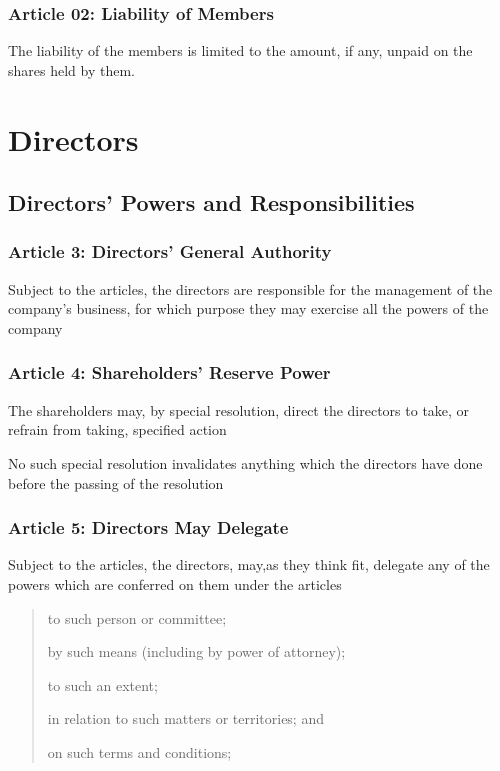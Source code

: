 \documentclass[letterpaper,10pt,openany,oneside,english]{sphinxmanual}
\begin{document}
\subsection{Article 02: Liability of Members}
\label{\detokenize{introduction:article-02-liability-of-members}}
The liability of the members is limited to the amount, if any, unpaid on the shares held by them.


\chapter{Directors}
\label{\detokenize{directors:directors}}\label{\detokenize{directors::doc}}

\section{Directors’ Powers and Responsibilities}
\label{\detokenize{directors:directors-powers-and-responsibilities}}

\subsection{Article 3: Directors’ General Authority}
\label{\detokenize{directors:article-3-directors-general-authority}}\label{\detokenize{directors:article-3}}
Subject to the articles, the directors are responsible for the management of the company’s business, for which purpose they may exercise all the powers of the company


\subsection{Article 4: Shareholders’ Reserve Power}
\label{\detokenize{directors:article-4-shareholders-reserve-power}}\label{\detokenize{directors:article-4}}
 The shareholders may, by special resolution, direct the directors to take, or refrain from taking, specified action

 No such special resolution invalidates anything which the directors have done before the passing of the resolution


\subsection{Article 5: Directors May Delegate}
\label{\detokenize{directors:article-5-directors-may-delegate}}\label{\detokenize{directors:article-5}}
 Subject to the articles, the directors, may,as they think fit, delegate any of the powers which are conferred on them under the articles
\begin{quote}

 to such person or committee;

 by such means (including by power of attorney);

 to such an extent;

 in relation to such matters or territories; and

 on such terms and conditions;
\end{quote}
\end{document}
